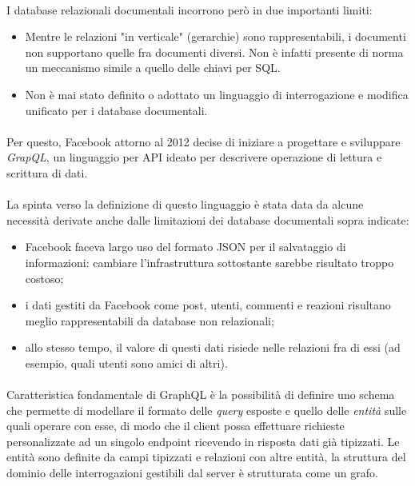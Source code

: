 \documentclass[a4paper, 12pt]{report}
\begin{document}
    \paragraph*{}
      I database relazionali documentali incorrono però in due importanti limiti:
      \begin{itemize}
        \item Mentre le relazioni "in verticale" (gerarchie) sono rappresentabili, i documenti non supportano quelle fra documenti diversi. Non è infatti presente di norma un meccanismo simile a quello delle chiavi per SQL.
        \item Non è mai stato definito o adottato un linguaggio di interrogazione e modifica unificato per i database documentali.
      \end{itemize}
    \paragraph*{}
      Per questo, Facebook attorno al 2012 decise di iniziare a progettare e sviluppare \emph{GrapQL}, un linguaggio per API ideato per descrivere operazione di lettura e scrittura di dati.
    \paragraph*{}
      La spinta verso la definizione di questo linguaggio è stata data da alcune necessità derivate anche dalle limitazioni dei database documentali sopra indicate:
      \begin{itemize}
        \item Facebook faceva largo uso del formato JSON per il salvataggio di informazioni: cambiare l'infrastruttura sottostante sarebbe risultato troppo costoso;
        \item i dati gestiti da Facebook come post, utenti, commenti e reazioni risultano meglio rappresentabili da database non relazionali;
        \item allo stesso tempo, il valore di questi dati risiede nelle relazioni fra di essi (ad esempio, quali utenti sono amici di altri).
      \end{itemize}
    \paragraph*{}
      Caratteristica fondamentale di GraphQL è la possibilità di definire uno schema che permette di modellare il formato delle \emph{query} esposte e quello delle \emph{entità} sulle quali operare con esse, di modo che il client possa effettuare richieste personalizzate ad un singolo endpoint ricevendo in risposta dati già tipizzati.
      Le entità sono definite da campi tipizzati e relazioni con altre entità, la struttura del dominio delle interrogazioni gestibili dal server è strutturata come un grafo.
\end{document}
